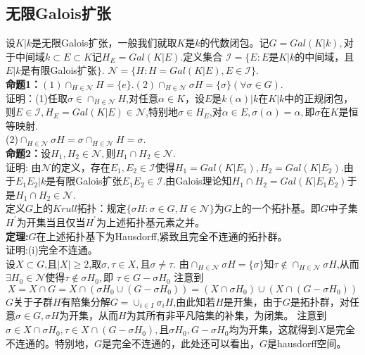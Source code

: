 \documentclass[UTF8]{article}
\begin{document}
 \subsection{无限Galois扩张}
   设$K|k$是无限Galois扩张，一般我们就取$K$是$k$的代数闭包。记$G=Gal(K|k),$对于中间域$k\subset E\subset K$记$H_{E}=Gal(K|E).$定义集合
   $\mathcal{I}=\{E:E$是$K|k$的中间域，且$E|k$是有限Galois扩张$\}$.
   $\mathcal{N}=\{H:H=Gal(K|E),E\in \mathcal{I}\}$.\\
   \textbf{命题1：}$(1)\cap_{H\in\mathcal{N}}H=\{e\}.(2)\cap_{H\in \mathcal{N}}\sigma H=\{\sigma\}(\forall \sigma \in G)$.\\
   证明：(1)任取$\sigma \in \cap_{H\in\mathcal{N}}H$,对任意$\alpha\in K$，设$E$是$k(\alpha)|k$在$K|k$中的正规闭包，则$E\in \mathcal{I},H_{E}=Gal(K|E)\in \mathcal{N}$,特别地$\sigma \in H_{E}$,对$\alpha \in E,\sigma(\alpha)=\alpha,$即$\sigma $在$K$是恒等映射.\\
   (2)$\cap_{H\in \mathcal{N}}\sigma H=\sigma \cap_{H\in\mathcal{N}}H={\sigma}$.\\
   \textbf{命题2：}设$H_{1},H_{2}\in \mathcal{N},$则$H_{1}\cap H_{2}\in \mathcal{N}.$\\
   证明: 由$\mathcal{N}$的定义，存在$E_{1},E_{2}\in \mathcal{I}$使得$H_{1}=Gal(K|E_{1}),H_{2}=Gal(K|E_{2}).$由于$E_{1}E_{2}|k$是有限Galois扩张$E_{1}E_{2}\in \mathcal{I}.$由Galois理论知$H_{1}\cap H_{2}=Gal(K|E_{1}E_{2})$于是$H_{1}\cap H_{2}\in \mathcal{N}.$\\
   定义$G$上的$Krull$拓扑：规定$\{\sigma H:\sigma \in G,H\in \mathcal{N}\}$为$G$上的一个拓扑基。即$G$中子集$H^{'}$为开集当且仅当$H^{'}$为上述拓扑基元素之并。\\
   \textbf{定理:}$G$在上述拓扑基下为Hausdorff,紧致且完全不连通的拓扑群。\\
   证明:(i)完全不连通。\\
     设$X\subset  G$,且$|X|\geq 2$,取$\sigma,\tau\in X,$且$\sigma \neq \tau.$
     由$\cap_{H\in \mathcal{N}}\sigma H=\{\sigma\}$知$\tau \notin \cap_{H\in \mathcal{N}}\sigma H$,从而$\exists H_{0}\in \mathcal{N}$使得$\tau \notin \sigma H_{0},$即
     $\tau\in G-\sigma H_{0}$
    注意到
    $$X=X\cap G=X\cap (\sigma H_{0}\cup (G-\sigma H_{0}))=(X\cap \sigma H_{0})\cup (X\cap (G-\sigma H_{0}))$$
   $G$关于子群$H$有陪集分解$G=\cup_{i\in I}\sigma_{i}H$,由此知若$H$是开集，由于$G$是拓扑群，对任意$\sigma \in G,$$\sigma H$为开集，从而$H$为其所有非平凡陪集的补集，为闭集。
   注意到$\sigma \in X\cap \sigma H_{0} ,\tau \in X\cap (G-\sigma H_{0}),$且$
   \sigma H_{0},G-\sigma H_{0}$均为开集，这就得到$X$是完全不连通的。特别地，$G$是完全不连通的，此处还可以看出，$G$是hausdorff空间。\\
   
\end{document}
